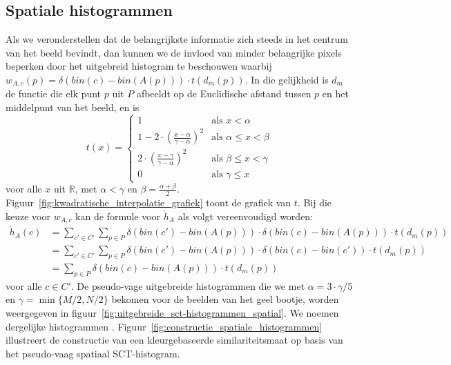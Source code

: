 \subsection{Spatiale histogrammen}

Als we veronderstellen dat
de belangrijkste informatie zich steeds in het centrum van het beeld bevindt, dan kunnen we
de invloed van minder belangrijke pixels beperken door het uitgebreid histogram te beschouwen waarbij
$w_{A,c}(p)=\delta(bin(c)-bin(A(p))) \cdot t(d_m(p))$. In die gelijkheid is $d_m$ de functie die 
elk punt $p$ uit $P$ afbeeldt op de Euclidische afstand tussen $p$ en het middelpunt van het beeld, 
en is
\begin{displaymath}
t(x) = \begin{cases}
1 & \textrm{als } x < \alpha \\
1 - 2 \cdot \left( \frac{x-\alpha}{\gamma - \alpha} \right)^2 & \textrm{als } \alpha \le x < \beta \\[6pt]
2 \cdot \left( \frac{x-\gamma}{\gamma - \alpha} \right)^2 & \textrm{als } \beta \le x < \gamma \\
0 & \textrm{als } \gamma \le x
\end{cases}
\end{displaymath}
voor alle $x$ uit $\mathbb{R}$, met $\alpha < \gamma$ en $\beta=\frac{\alpha + \beta}{2}$. 
Figuur~\ref{fig:kwadratische_interpolatie_grafiek} toont de grafiek van $t$. Bij
die keuze voor $w_{A,c}$ kan de formule voor $\mathring{h}_A$ als volgt vereenvoudigd worden:
\begin{align*}
\mathring{h}_A(c)
 & = \displaystyle \sum_{c' \in C'} \sum_{p \in P} \delta (bin(c')-bin(A(p))) \cdot \delta (bin(c)-bin(A(p))) \cdot t(d_m(p)) \\
 & = \displaystyle \sum_{c' \in C'} \sum_{p \in P} \delta (bin(c')-bin(A(p))) \cdot \delta (bin(c)-bin(c')) \cdot t(d_m(p)) \\
 & = \displaystyle \sum_{p \in P} \delta (bin(c)-bin(A(p))) \cdot t(d_m(p))
\end{align*}
voor alle $c \in C'$. De pseudo-vage uitgebreide
histogrammen die we met $\alpha=3 \cdot \gamma / 5$ en $\gamma = \min\{M/2, N/2\}$ bekomen voor 
de beelden van het geel bootje, worden weergegeven in
figuur~\ref{fig:uitgebreide_sct-histogrammen_spatial}. We noemen dergelijke histogrammen
. Figuur~\ref{fig:constructie_spatiale_histogrammen} illustreert
de constructie van een kleurgebaseerde similariteitsmaat op basis van het pseudo-vaag 
spatiaal SCT-histogram.

